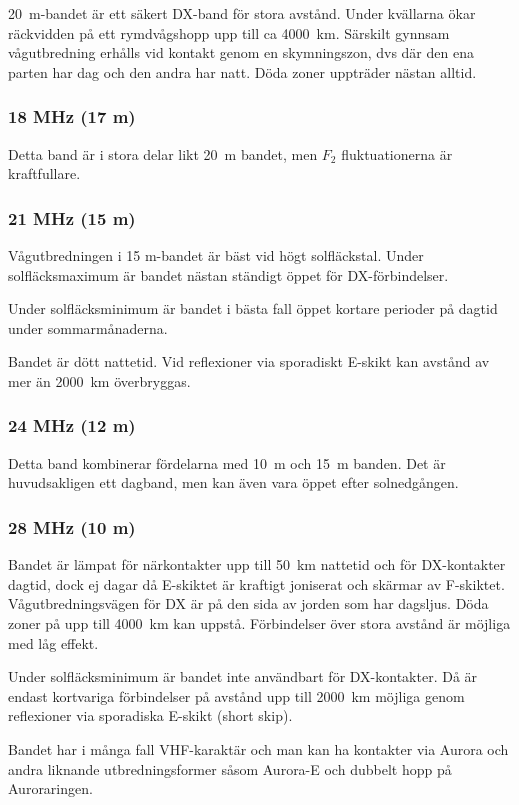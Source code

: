 20~m-bandet är ett säkert DX-band för stora avstånd.
Under kvällarna ökar räckvidden på ett rymdvågshopp upp till ca 4000~km.
Särskilt gynnsam vågutbredning erhålls vid kontakt genom en skymningszon, dvs
där den ena parten har dag och den andra har natt.
Döda zoner uppträder nästan alltid.

\subsubsection{18 MHz (17 m)}

Detta band är i stora delar likt 20~m bandet, men \(F_2\) fluktuationerna
är kraftfullare.

\subsubsection{21 MHz (15 m)}

Vågutbredningen i 15 m-bandet är bäst vid högt solfläckstal.
Under solfläcksmaximum är bandet nästan ständigt öppet för DX-förbindelser.

Under solfläcksminimum är bandet i bästa fall öppet kortare perioder
på dagtid under sommarmånaderna.

Bandet är dött nattetid. Vid reflexioner via sporadiskt E-skikt kan
avstånd av mer än 2000~km överbryggas.

\subsubsection{24 MHz (12 m)}

Detta band kombinerar fördelarna med 10~m och 15~m banden.
Det är huvudsakligen ett dagband, men kan även vara öppet efter
solnedgången.

\subsubsection{28 MHz (10 m)}

Bandet är lämpat för närkontakter upp till 50~km nattetid och för DX-kontakter
dagtid, dock ej dagar då E-skiktet är kraftigt joniserat och skärmar av
F-skiktet.
Vågutbredningsvägen för DX är på den sida av jorden som har dagsljus.
Döda zoner på upp till 4000~km kan uppstå.
Förbindelser över stora avstånd är möjliga med låg effekt.

Under solfläcksminimum är bandet inte användbart för DX-kontakter.
Då är endast kortvariga förbindelser på avstånd upp till 2000~km möjliga
genom reflexioner via sporadiska E-skikt (short skip).

Bandet har i många fall VHF-karaktär och man kan ha kontakter via Aurora och
andra liknande utbredningsformer såsom Aurora-E och dubbelt hopp på
Auroraringen.

